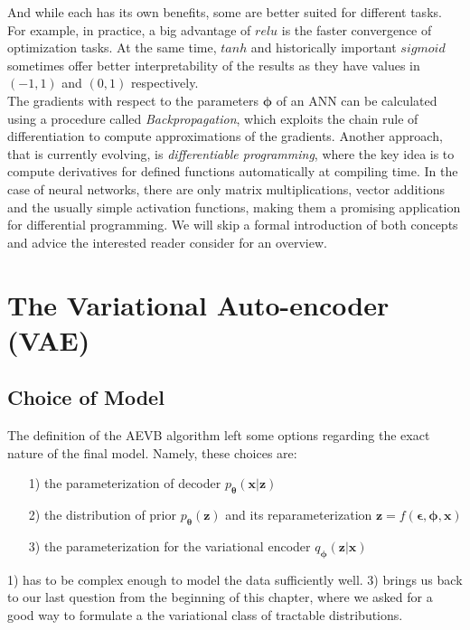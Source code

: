 \documentclass[12pt]{report}
\theoremstyle{definition}
\begin{document}
And while each has its own benefits, some are better suited for different tasks. For example, in practice, a big advantage of $relu$ is the faster convergence of optimization tasks. At the same time, $tanh$ and historically important $sigmoid$ sometimes offer better interpretability of the results as they have values in $(-1, 1)$ and $(0, 1)$ respectively. \\
The gradients with respect to the parameters $\pmb{\phi}$ of an ANN can be calculated using a procedure called \emph{Backpropagation}, which exploits the chain rule of differentiation to compute approximations of the gradients. Another approach, that is currently evolving, is \emph{differentiable programming}, where the key idea is to compute derivatives for defined functions automatically at compiling time. In the case of neural networks, there are only matrix multiplications, vector additions and the usually simple activation functions, making them a promising application for differential programming. We will skip a formal introduction of both concepts and advice the interested reader consider \cite{diff} for an overview.

\section{The Variational Auto-encoder (VAE)}
\subsection{Choice of Model}

The definition of the AEVB algorithm left some options regarding the exact nature of the final model. Namely, these choices are:
\begin{itemize}
\item[1)] the parameterization of decoder $p_{\pmb{\theta}}(\mathbf{x}|\mathbf{z})$
\item[2)] the distribution of prior $p_{\pmb{\theta}}(\mathbf{z})$ and its reparameterization $\mathbf{z} = f(\pmb{\epsilon}, \pmb{\phi}, \mathbf{x})$
\item[3)] the parameterization for the variational encoder $q_{\pmb{\phi}}(\mathbf{z}|\mathbf{x})$
\end{itemize}
1) has to be complex enough to model the data sufficiently well. 3) brings us back to our last question from the beginning of this chapter, where we asked for a good way to formulate a the variational class of tractable distributions.
\end{document}
